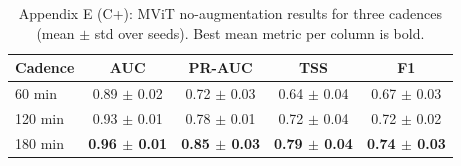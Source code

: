 \begin{table}[p]
\centering
\scriptsize
\caption{Appendix E (C+): MViT no-augmentation results for three cadences (mean $\pm$ std over seeds). Best mean metric per column is bold.}
\label{tab:appE_mvit_cplus}
\begin{tabular}{lcccc}
\toprule
Cadence & AUC & PR-AUC & TSS & F1 \\
\midrule
60 min & 0.89 $\pm$ 0.02 & 0.72 $\pm$ 0.03 & 0.64 $\pm$ 0.04 & 0.67 $\pm$ 0.03 \\
120 min & 0.93 $\pm$ 0.01 & 0.78 $\pm$ 0.01 & 0.72 $\pm$ 0.04 & 0.72 $\pm$ 0.02 \\
180 min & \textbf{0.96 $\pm$ 0.01} & \textbf{0.85 $\pm$ 0.03} & \textbf{0.79 $\pm$ 0.04} & \textbf{0.74 $\pm$ 0.03} \\
\bottomrule
\end{tabular}
\end{table}
